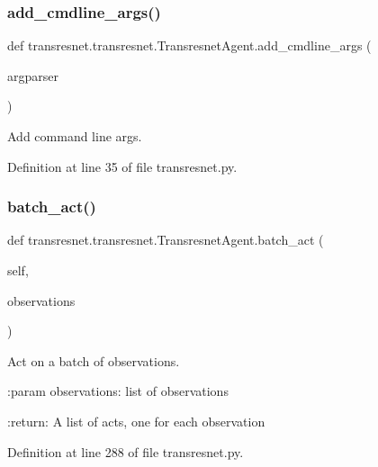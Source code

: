 \subsubsection{\texorpdfstring{add\+\_\+cmdline\+\_\+args()}{add\_cmdline\_args()}}
{\footnotesize\ttfamily def transresnet.\+transresnet.\+Transresnet\+Agent.\+add\+\_\+cmdline\+\_\+args (\begin{DoxyParamCaption}\item[{}]{argparser }\end{DoxyParamCaption})\hspace{0.3cm}{\ttfamily [static]}}

\begin{DoxyVerb}Add command line args.\end{DoxyVerb}
 

Definition at line 35 of file transresnet.\+py.

\mbox{\label{classtransresnet_1_1transresnet_1_1TransresnetAgent_a5eadf6ccc4b1d15a520a70d111bff493}} 
\subsubsection{\texorpdfstring{batch\+\_\+act()}{batch\_act()}}
{\footnotesize\ttfamily def transresnet.\+transresnet.\+Transresnet\+Agent.\+batch\+\_\+act (\begin{DoxyParamCaption}\item[{}]{self,  }\item[{}]{observations }\end{DoxyParamCaption})}

\begin{DoxyVerb}Act on a batch of observations.

:param observations:
    list of observations

:return:
    A list of acts, one for each observation
\end{DoxyVerb}
 

Definition at line 288 of file transresnet.\+py.



